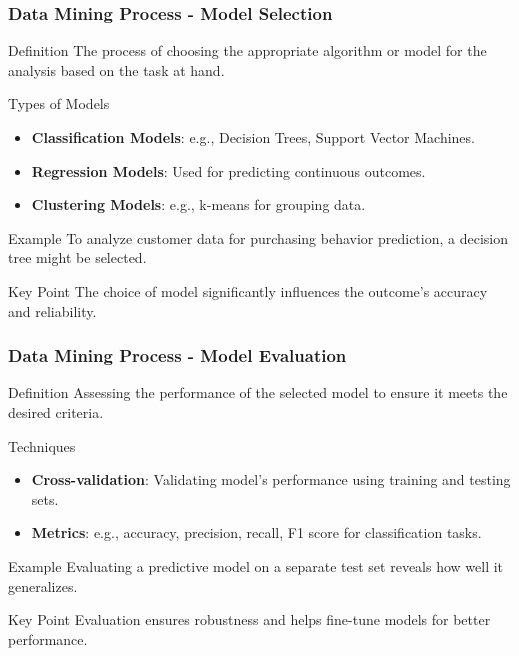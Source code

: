 \documentclass[aspectratio=169]{beamer}
\begin{document}
\begin{frame}[fragile]
    \frametitle{Data Mining Process - Model Selection}
    \begin{block}{Definition}
        The process of choosing the appropriate algorithm or model for the analysis based on the task at hand.
    \end{block}
    \begin{block}{Types of Models}
        \begin{itemize}
            \item \textbf{Classification Models}: e.g., Decision Trees, Support Vector Machines.
            \item \textbf{Regression Models}: Used for predicting continuous outcomes.
            \item \textbf{Clustering Models}: e.g., k-means for grouping data.
        \end{itemize}
    \end{block}
    \begin{block}{Example}
        To analyze customer data for purchasing behavior prediction, a decision tree might be selected.
    \end{block}
    \begin{block}{Key Point}
        The choice of model significantly influences the outcome's accuracy and reliability.
    \end{block}
\end{frame}

\begin{frame}[fragile]
    \frametitle{Data Mining Process - Model Evaluation}
    \begin{block}{Definition}
        Assessing the performance of the selected model to ensure it meets the desired criteria.
    \end{block}
    \begin{block}{Techniques}
        \begin{itemize}
            \item \textbf{Cross-validation}: Validating model’s performance using training and testing sets.
            \item \textbf{Metrics}: e.g., accuracy, precision, recall, F1 score for classification tasks.
        \end{itemize}
    \end{block}
    \begin{block}{Example}
        Evaluating a predictive model on a separate test set reveals how well it generalizes.
    \end{block}
    \begin{block}{Key Point}
        Evaluation ensures robustness and helps fine-tune models for better performance.
    \end{block}
\end{frame}
\end{document}
